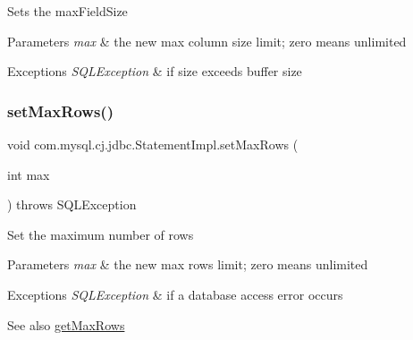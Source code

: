 Sets the max\+Field\+Size


\begin{DoxyParams}{Parameters}
{\em max} & the new max column size limit; zero means unlimited\\
\hline
\end{DoxyParams}

\begin{DoxyExceptions}{Exceptions}
{\em S\+Q\+L\+Exception} & if size exceeds buffer size \\
\hline
\end{DoxyExceptions}
\mbox{\label{classcom_1_1mysql_1_1cj_1_1jdbc_1_1_statement_impl_ab0226070ba29ae3c0cf7431d7b902c01}} 
\subsubsection{\texorpdfstring{set\+Max\+Rows()}{setMaxRows()}}
{\footnotesize\ttfamily void com.\+mysql.\+cj.\+jdbc.\+Statement\+Impl.\+set\+Max\+Rows (\begin{DoxyParamCaption}\item[{int}]{max }\end{DoxyParamCaption}) throws S\+Q\+L\+Exception}

Set the maximum number of rows


\begin{DoxyParams}{Parameters}
{\em max} & the new max rows limit; zero means unlimited\\
\hline
\end{DoxyParams}

\begin{DoxyExceptions}{Exceptions}
{\em S\+Q\+L\+Exception} & if a database access error occurs\\
\hline
\end{DoxyExceptions}
\begin{DoxySeeAlso}{See also}
\mbox{\hyperlink{classcom_1_1mysql_1_1cj_1_1jdbc_1_1_statement_impl_ae2447bc18fbb4aba8ef64f48f0c90c36}{get\+Max\+Rows}} 
\end{DoxySeeAlso}
\mbox{\label{classcom_1_1mysql_1_1cj_1_1jdbc_1_1_statement_impl_abf41b78c8e7c3e4f62f7bedb8bf1a4b0}} 

